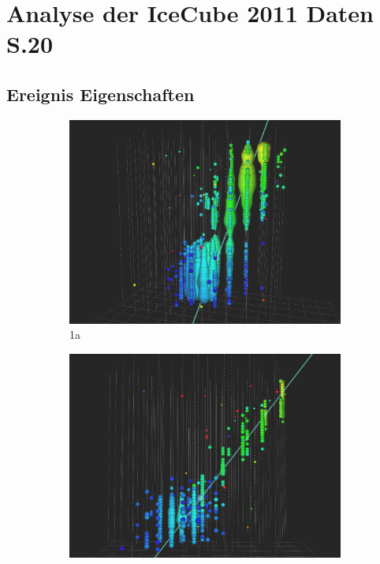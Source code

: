 \thispagestyle{plain}
\chapter{Analyse der IceCube 2011 Daten S.20}
\section{Ereignis Eigenschaften}
\begin{figure}
\begin{subfigure}{.33\textwidth}
  \centering
  \includegraphics[width=\textwidth]{./Plots/Bundle.png}
  \caption{1a}
  \label{fig:sfig1}
\end{subfigure}%
\begin{subfigure}{.33\textwidth}
  \centering
  \includegraphics[width=\textwidth]{./Plots/Leading.png}

\end{subfigure}
\end{figure}
